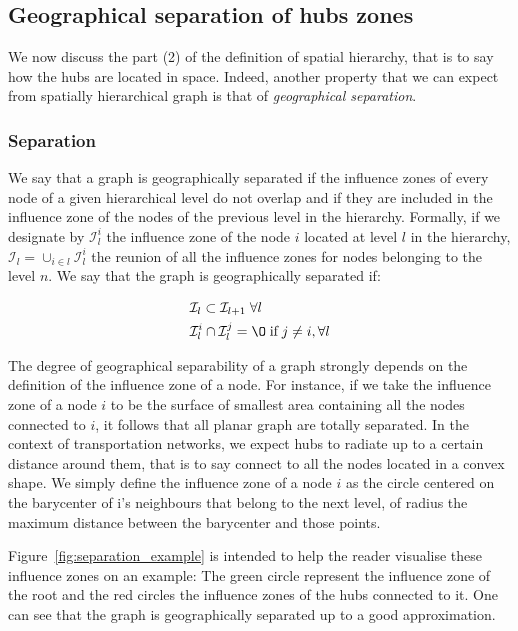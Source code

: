 \subsection{Geographical separation of hubs zones} 

We now discuss the part (2) of the definition of spatial hierarchy, that is to
say how the hubs are located in space. Indeed, another property that we can
expect from spatially hierarchical graph is that of \emph{geographical
separation}.


\subsubsection{Separation}
\label{ssub:separation}

We say that a graph is geographically separated if the influence zones of every
node of a given hierarchical level do not overlap and if they are included in
the influence zone of the nodes of the previous level in the hierarchy.
Formally, if we designate by $\mathcal{I}^i_l$ the influence zone of the node
$i$ located at level $l$ in the hierarchy, $\mathcal{I}_l = \cup_{i \in l}
\mathcal{I}^i_l$ the reunion of all the influence zones for nodes belonging to
the level $n$. We say that the graph is geographically separated if:

\begin{align}
    &\mathcal{I}_l \subset \mathcal{I}_{l+1} \; \forall l\\
    &\mathcal{I}^i_l \cap \mathcal{I}^j_l = \O \; \text{if} \; j \neq i, \forall l
\end{align}

The degree of geographical separability of a graph strongly depends on the
definition of the influence zone of a node. For instance, if we take the
influence zone of a node $i$ to be the surface of smallest area containing all
the nodes connected to $i$, it follows that all planar graph are totally
separated.  In the context of transportation networks, we expect hubs to radiate
up to a certain distance around them, that is to say connect to all the nodes
located in a convex shape. We simply define the influence zone of a node $i$ as
the circle centered on the barycenter of i's neighbours that belong to the next
level, of radius the maximum distance between the barycenter and those points. 

Figure~\ref{fig:separation_example} is intended to help the reader visualise
these influence zones on an example: The green circle represent the influence
zone of the root and the red circles the influence zones of the hubs connected
to it. One can see that the graph is geographically separated up to a good
approximation.

